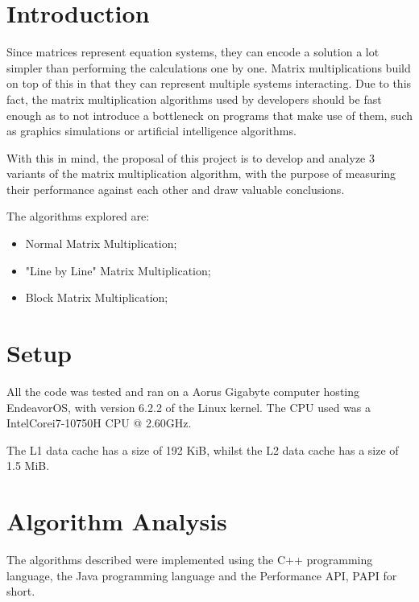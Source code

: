 \documentclass[11pt,a4paper]{article}
\begin{document}
\pagebreak

\tableofcontents
\pagebreak

\pagestyle{plain} %
\setcounter{page}{1}

\section{Introduction}

Since matrices represent equation systems, they can encode a solution a lot simpler than performing the calculations one by one. Matrix multiplications build on top of this in that they can represent multiple systems interacting. Due to this fact, the matrix multiplication algorithms used by developers should be fast enough as to not introduce a bottleneck on programs that make use of them, such as graphics simulations or artificial intelligence algorithms.

With this in mind, the proposal of this project is to develop and analyze 3 variants of the matrix multiplication algorithm, with the purpose of measuring their performance against each other and draw valuable conclusions.

The algorithms explored are:
\begin{itemize}
    \item Normal Matrix Multiplication;
    \item "Line by Line" Matrix Multiplication;
    \item Block Matrix Multiplication;
\end{itemize}

\section{Setup}

All the code was tested and ran on a Aorus Gigabyte computer hosting EndeavorOS, with version 6.2.2 of the Linux kernel. The CPU used was a Intel\textregistered Core\texttrademark i7-10750H CPU @ 2.60GHz.

The L1 data cache has a size of 192 KiB, whilst the L2 data cache has a size of 1.5 MiB.

\section{Algorithm Analysis}

The algorithms described were implemented using the C++ programming language, the Java programming language and the Performance API, PAPI for short.
\end{document}
